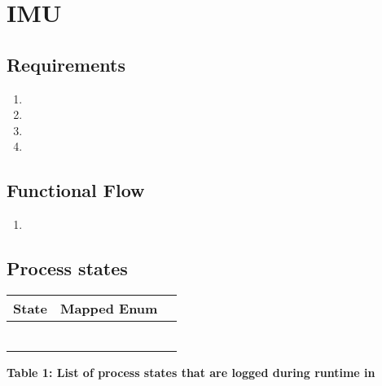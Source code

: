 \section{IMU}
\subsection{Requirements}

\begin{enumerate}
	\item 
	\item 
	\item 
	\item 
	
\end{enumerate}

\subsection{Functional Flow}

\begin{enumerate}
	\item
	
\end{enumerate}

\subsection{Process states}

\begin{table}[H]
	\begin{center}
		\begin{tabular}{|p{3 cm}|p{5 cm}|p{5 cm}|}
			\hline
			\textbf{State} & \textbf{Mapped Enum} \\
			\hline
			&  \\
			\hline
			&  \\
			\hline
			&  \\
			\hline
			&  \\
			\hline
			&  \\
			\hline
			&  \\
			\hline
		\end{tabular}
		\begin{center}
			\textbf{Table 1: List of process states that are logged during runtime in }
		\end{center}
	\end{center}
\end{table}

